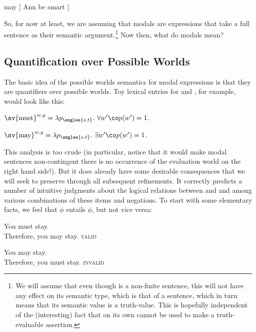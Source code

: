\ex may [ Ann be smart ] \xe

So, for now at least, we are assuming that modals are expressions that take a
full sentence as their semantic argument.\footnote{We will assume that even
  though  is a non-finite sentence, this will not have
  any effect on its semantic type, which is that of a sentence, which in turn
  means that its semantic value is a truth-value. This is hopefully independent
  of the (interesting) fact that  on its own cannot be
  used to make a truth-evaluable assertion.} Now then, what do modals mean?

\subsection{Quantification over Possible Worlds} \label{sec:quant-over-poss}

The
basic idea of the possible worlds semantics for modal expressions is that they
are quantifiers over possible worlds. Toy lexical entries for 
and , for example, would look like this:

\ex $\sv{\mbox{must}}^{w,g} = \lambda p_{\angles{s,t}}.\ \forall w'\co p(w') =
1$. \xe

\ex $\sv{\mbox{may}}^{w,g} = \lambda p_{\angles{s,t}}.\ \exists w'\co p(w') =
1$. \xe

This analysis is too crude (in particular, notice that it would make modal
sentences non-contingent \dash there is no occurrence of the evaluation world on
the right hand side!). But it does already have some desirable consequences that
we will seek to preserve through all subsequent refinements. It correctly
predicts a number of intuitive judgments about the logical relations between
 and  and among various combinations of these
items and negations. To start with some elementary facts, we feel that
 $\phi$ entails  $\phi$, but not vice versa:

\ex You must stay.\\
Therefore, you may stay. \hfill\textsc{valid} \xe

\ex You may stay.\\
Therefore, you must stay. \hfill\textsc{invalid} \xe

